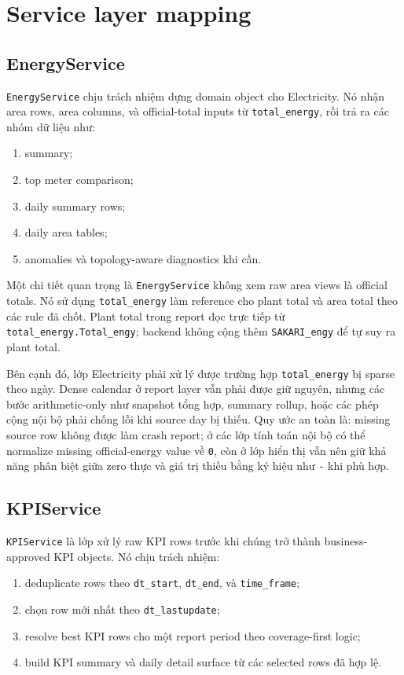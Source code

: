 \section{Service layer mapping}

\subsection{EnergyService}

\texttt{EnergyService} chịu trách nhiệm dựng domain object cho Electricity. Nó nhận area rows, area columns, và official-total inputs từ \texttt{total\_energy}, rồi trả ra các nhóm dữ liệu như:

\begin{enumerate}[label=-]
\item summary;
\item top meter comparison;
\item daily summary rows;
\item daily area tables;
\item anomalies và topology-aware diagnostics khi cần.
\end{enumerate}

Một chi tiết quan trọng là \texttt{EnergyService} không xem raw area views là official totals. Nó sử dụng \texttt{total\_energy} làm reference cho plant total và area total theo các rule đã chốt. Plant total trong report đọc trực tiếp từ \texttt{total\_energy.Total\_engy}; backend không cộng thêm \texttt{SAKARI\_engy} để tự suy ra plant total.

Bên cạnh đó, lớp Electricity phải xử lý được trường hợp \texttt{total\_energy} bị sparse theo ngày. Dense calendar ở report layer vẫn phải được giữ nguyên, nhưng các bước arithmetic-only như snapshot tổng hợp, summary rollup, hoặc các phép cộng nội bộ phải chống lỗi khi source day bị thiếu. Quy ước an toàn là: missing source row không được làm crash report; ở các lớp tính toán nội bộ có thể normalize missing official-energy value về \texttt{0}, còn ở lớp hiển thị vẫn nên giữ khả năng phân biệt giữa zero thực và giá trị thiếu bằng ký hiệu như \texttt{-} khi phù hợp.

\subsection{KPIService}

\texttt{KPIService} là lớp xử lý raw KPI rows trước khi chúng trở thành business-approved KPI objects. Nó chịu trách nhiệm:

\begin{enumerate}[label=-]
\item deduplicate rows theo \texttt{dt\_start}, \texttt{dt\_end}, và \texttt{time\_frame};
\item chọn row mới nhất theo \texttt{dt\_lastupdate};
\item resolve best KPI rows cho một report period theo coverage-first logic;
\item build KPI summary và daily detail surface từ các selected rows đã hợp lệ.
\end{enumerate}

